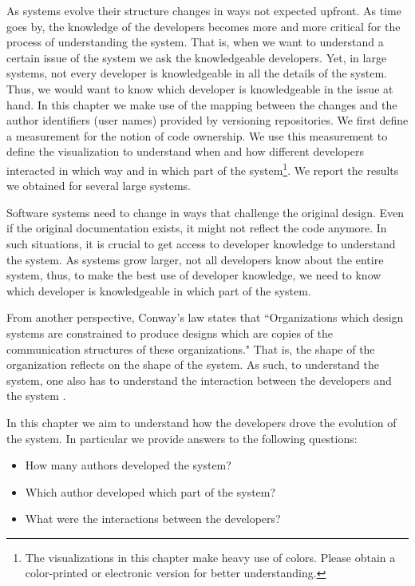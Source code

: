 As systems evolve their structure changes in ways not expected upfront. As time goes by, the knowledge of the developers becomes more and more critical for the process of understanding the system. That is, when we want to understand a certain issue of the system we ask the knowledgeable developers. Yet, in large systems, not every developer is knowledgeable in all the details of the system. Thus, we would want to know which developer is knowledgeable in the issue at hand. In this chapter we make use of the mapping between the changes and the author identifiers (\eg user names) provided by versioning repositories. We first define a measurement for the notion of code ownership. We use this measurement to define the \omap visualization to understand when and how different developers interacted in which way and in which part of the system\footnote{The visualizations in this chapter make heavy use of colors. Please obtain a color-printed or electronic version for better understanding.}. We report the results we obtained for several large systems.

Software systems need to change in ways that challenge the original design. Even if the original documentation exists, it might not reflect the code anymore. In such situations, it is crucial to get access to developer knowledge to understand the system. As systems grow larger, not all developers know about the entire system, thus, to make the best use of developer knowledge, we need to know which developer is knowledgeable in which part of the system.

From another perspective, Conway's law \cite{Conw68a} states that ``Organizations which design systems are constrained to produce designs which are copies of the communication structures of these organizations." That is, the shape of the organization reflects on the shape of the system. As such, to understand the system, one also has to understand the interaction between the developers and the system \cite{Deme02a}.

In this chapter we aim to understand how the developers drove the evolution of the system. In particular we provide answers to the following questions:
\begin{itemize}
\item How many authors developed the system?
\item Which author developed which part of the system?
\item What were the interactions between the developers?
\end{itemize}

